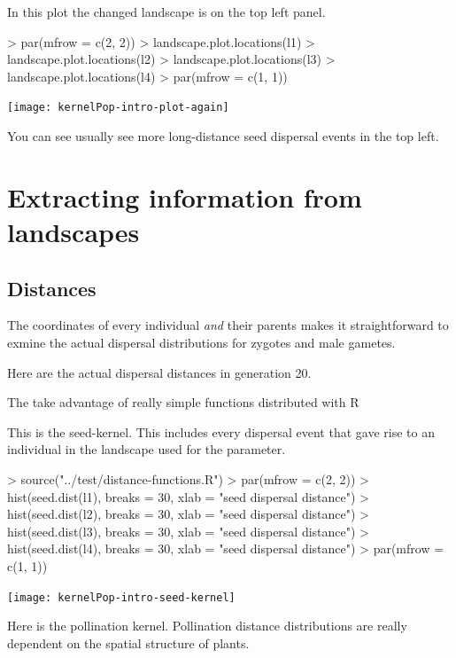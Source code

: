 \documentclass[10pt]{article}
\begin{document}
In this plot the changed landscape is on the top left panel. 

\begin{Schunk}
\begin{Sinput}
> par(mfrow = c(2, 2))
> landscape.plot.locations(l1)
> landscape.plot.locations(l2)
> landscape.plot.locations(l3)
> landscape.plot.locations(l4)
> par(mfrow = c(1, 1))
\end{Sinput}
\end{Schunk}
\texttt{[image: kernelPop-intro-plot-again]}

You can see usually see more long-distance seed dispersal events in the top left.


\section{Extracting information from landscapes}
\label{sec:extr-inform-from}

\subsection{Distances}
\label{sec:distances}

The coordinates of every individual \emph{and} their parents makes it
straightforward to exmine the actual dispersal distributions for
zygotes and male gametes.

Here are the actual dispersal distances in generation 20.

The take advantage of really simple functions distributed with R

This is the seed-kernel. This includes every dispersal event that gave
rise to an individual in the landscape used for the parameter.

\begin{Schunk}
\begin{Sinput}
> source("../test/distance-functions.R")
> par(mfrow = c(2, 2))
> hist(seed.dist(l1), breaks = 30, xlab = "seed dispersal distance")
> hist(seed.dist(l2), breaks = 30, xlab = "seed dispersal distance")
> hist(seed.dist(l3), breaks = 30, xlab = "seed dispersal distance")
> hist(seed.dist(l4), breaks = 30, xlab = "seed dispersal distance")
> par(mfrow = c(1, 1))
\end{Sinput}
\end{Schunk}
\texttt{[image: kernelPop-intro-seed-kernel]}

Here is the pollination kernel.  Pollination distance distributions
are really dependent on the spatial structure of plants.
\end{document}
